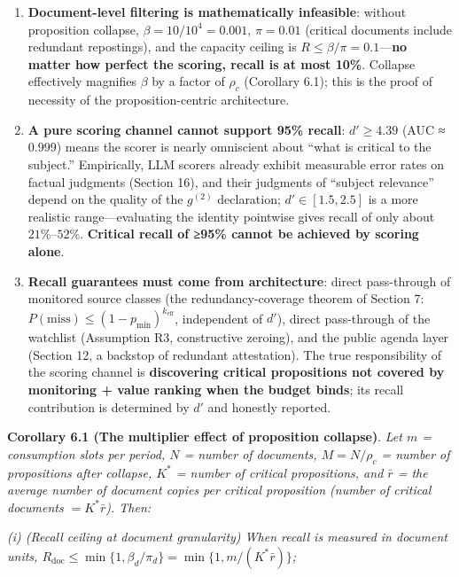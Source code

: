 \documentclass[
  11pt]{article}
\providecommand{\tightlist}{%
  \setlength{\itemsep}{0pt}\setlength{\parskip}{0pt}}
\begin{document}
\begin{enumerate}
\def\labelenumi{\arabic{enumi}.}
\tightlist
\item
  \textbf{Document-level filtering is mathematically infeasible}:
  without proposition collapse, \(\beta = 10/10^4 = 0.001\),
  \(\pi = 0.01\) (critical documents include redundant repostings), and
  the capacity ceiling is \(R \le \beta/\pi = 0.1\)---\textbf{no matter
  how perfect the scoring, recall is at most 10\%}. Collapse effectively
  magnifies \(\beta\) by a factor of \(\rho_c\) (Corollary 6.1); this is
  the proof of necessity of the proposition-centric architecture.
\item
  \textbf{A pure scoring channel cannot support 95\% recall}:
  \(d' \ge 4.39\) (AUC ≈ 0.999) means the scorer is nearly omniscient
  about ``what is critical to the subject.'' Empirically, LLM scorers
  already exhibit measurable error rates on factual judgments (Section
  16), and their judgments of ``subject relevance'' depend on the
  quality of the \(g^{(2)}\) declaration; \(d' \in [1.5, 2.5]\) is a
  more realistic range---evaluating the identity pointwise gives recall
  of only about \(21\%\)--\(52\%\). \textbf{Critical recall of ≥95\%
  cannot be achieved by scoring alone}.
\item
  \textbf{Recall guarantees must come from architecture}: direct
  pass-through of monitored source classes (the redundancy-coverage
  theorem of Section 7:
  \(P(\mathrm{miss}) \le (1-p_{\min})^{k_{\mathrm{eff}}}\), independent
  of \(d'\)), direct pass-through of the watchlist (Assumption R3,
  constructive zeroing), and the public agenda layer (Section 12, a
  backstop of redundant attestation). The true responsibility of the
  scoring channel is \textbf{discovering critical propositions not
  covered by monitoring + value ranking when the budget binds}; its
  recall contribution is determined by \(d'\) and honestly reported.
\end{enumerate}

\textbf{Corollary 6.1 (The multiplier effect of proposition collapse)}.
\emph{Let \(m\) = consumption slots per period, \(N\) = number of
documents, \(M = N/\rho_c\) = number of propositions after collapse,
\(K^*\) = number of critical propositions, and \(\bar r\) = the average
number of document copies per critical proposition (number of critical
documents \(= K^*\bar r\)). Then:}

\emph{(i) (Recall ceiling at document granularity) When recall is
measured in document units,
\(R_{\mathrm{doc}} \le \min\{1, \beta_d/\pi_d\} = \min\{1, m/(K^*\bar r)\}\);}
\end{document}
